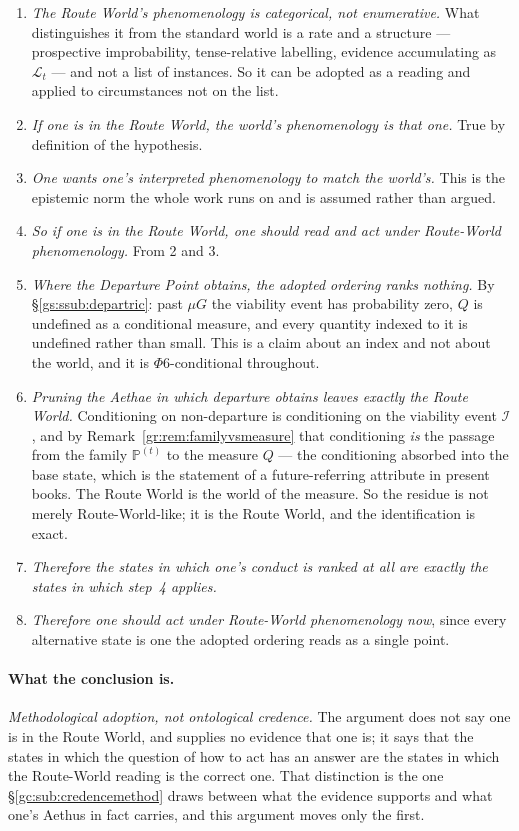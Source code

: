 \documentclass[11pt]{article}
\numberwithin{equation}{section}
\theoremstyle{plain}
\theoremstyle{definition}
\theoremstyle{remark}
\newcommand{\PP}{\mathbb{P}}
\newcommand{\Imm}{\mathcal{I}}
\newcommand{\Lc}{\mathcal{L}}
\begin{document}
\begin{enumerate}\setlength\itemsep{2pt}
\item \emph{The Route World's phenomenology is categorical, not
enumerative.} What distinguishes it from the standard world is a rate
and a structure --- prospective improbability, tense-relative labelling,
evidence accumulating as $\Lc_t$ --- and not a list of instances. So it
can be adopted as a reading and applied to circumstances not on the
list.
\item \emph{If one is in the Route World, the world's phenomenology is
that one.} True by definition of the hypothesis.
\item \emph{One wants one's interpreted phenomenology to match the
world's.} This is the epistemic norm the whole work runs on and is
assumed rather than argued.
\item \emph{So if one is in the Route World, one should read and act
under Route-World phenomenology.} From 2 and 3.
\item \emph{Where the Departure Point obtains, the adopted ordering
ranks nothing.} By \S\ref{gs:ssub:departric}: past $\mu G$ the viability
event has probability zero, $Q$ is undefined as a conditional measure,
and every quantity indexed to it is undefined rather than small. This is
a claim about an index and not about the world, and it is
$\Phi6$-conditional throughout.
\item \emph{Pruning the Aethae in which departure obtains leaves exactly
the Route World.} Conditioning on non-departure is conditioning on the
viability event $\Imm$, and by
Remark~\ref{gr:rem:familyvsmeasure} that conditioning \emph{is} the
passage from the family $\PP^{(t)}$ to the measure $Q$ --- the
conditioning absorbed into the base state, which is the statement of a
future-referring attribute in present books. The Route World is the
world of the measure. So the residue is not merely Route-World-like; it
is the Route World, and the identification is exact.
\item \emph{Therefore the states in which one's conduct is ranked at all
are exactly the states in which step~4 applies.}
\item \emph{Therefore one should act under Route-World phenomenology
now}, since every alternative state is one the adopted ordering reads as
a single point.
\end{enumerate}

\paragraph{What the conclusion is.} \emph{Methodological adoption, not
ontological credence.} The argument does not say one is in the Route
World, and supplies no evidence that one is; it says that the states in
which the question of how to act has an answer are the states in which
the Route-World reading is the correct one. That distinction is the one
\S\ref{gc:sub:credencemethod} draws between what the evidence supports
and what one's Aethus in fact carries, and this argument moves only the
first.
\end{document}
